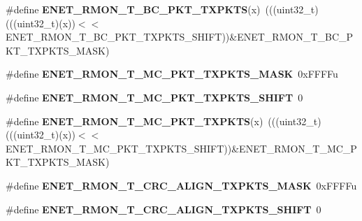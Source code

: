 \begin{DoxyCompactItemize}
\item 
\#define {\bfseries E\+N\+E\+T\+\_\+\+R\+M\+O\+N\+\_\+\+T\+\_\+\+B\+C\+\_\+\+P\+K\+T\+\_\+\+T\+X\+P\+K\+TS}(x)~(((uint32\+\_\+t)(((uint32\+\_\+t)(x))$<$$<$E\+N\+E\+T\+\_\+\+R\+M\+O\+N\+\_\+\+T\+\_\+\+B\+C\+\_\+\+P\+K\+T\+\_\+\+T\+X\+P\+K\+T\+S\+\_\+\+S\+H\+I\+FT))\&E\+N\+E\+T\+\_\+\+R\+M\+O\+N\+\_\+\+T\+\_\+\+B\+C\+\_\+\+P\+K\+T\+\_\+\+T\+X\+P\+K\+T\+S\+\_\+\+M\+A\+SK)\hypertarget{group__ENET__Register__Masks_ga44c8eef437f06566360fde04150c385c}{}\label{group__ENET__Register__Masks_ga44c8eef437f06566360fde04150c385c}

\item 
\#define {\bfseries E\+N\+E\+T\+\_\+\+R\+M\+O\+N\+\_\+\+T\+\_\+\+M\+C\+\_\+\+P\+K\+T\+\_\+\+T\+X\+P\+K\+T\+S\+\_\+\+M\+A\+SK}~0x\+F\+F\+F\+Fu\hypertarget{group__ENET__Register__Masks_gaf3856023c28aa2585937b9b2e3e46fcd}{}\label{group__ENET__Register__Masks_gaf3856023c28aa2585937b9b2e3e46fcd}

\item 
\#define {\bfseries E\+N\+E\+T\+\_\+\+R\+M\+O\+N\+\_\+\+T\+\_\+\+M\+C\+\_\+\+P\+K\+T\+\_\+\+T\+X\+P\+K\+T\+S\+\_\+\+S\+H\+I\+FT}~0\hypertarget{group__ENET__Register__Masks_ga5b480910d2725a8c75b23a0327898400}{}\label{group__ENET__Register__Masks_ga5b480910d2725a8c75b23a0327898400}

\item 
\#define {\bfseries E\+N\+E\+T\+\_\+\+R\+M\+O\+N\+\_\+\+T\+\_\+\+M\+C\+\_\+\+P\+K\+T\+\_\+\+T\+X\+P\+K\+TS}(x)~(((uint32\+\_\+t)(((uint32\+\_\+t)(x))$<$$<$E\+N\+E\+T\+\_\+\+R\+M\+O\+N\+\_\+\+T\+\_\+\+M\+C\+\_\+\+P\+K\+T\+\_\+\+T\+X\+P\+K\+T\+S\+\_\+\+S\+H\+I\+FT))\&E\+N\+E\+T\+\_\+\+R\+M\+O\+N\+\_\+\+T\+\_\+\+M\+C\+\_\+\+P\+K\+T\+\_\+\+T\+X\+P\+K\+T\+S\+\_\+\+M\+A\+SK)\hypertarget{group__ENET__Register__Masks_gacb7fa6647506149367368bd1abcdc94e}{}\label{group__ENET__Register__Masks_gacb7fa6647506149367368bd1abcdc94e}

\item 
\#define {\bfseries E\+N\+E\+T\+\_\+\+R\+M\+O\+N\+\_\+\+T\+\_\+\+C\+R\+C\+\_\+\+A\+L\+I\+G\+N\+\_\+\+T\+X\+P\+K\+T\+S\+\_\+\+M\+A\+SK}~0x\+F\+F\+F\+Fu\hypertarget{group__ENET__Register__Masks_gacccd1e251e3c6aa0159af65a0aee2772}{}\label{group__ENET__Register__Masks_gacccd1e251e3c6aa0159af65a0aee2772}

\item 
\#define {\bfseries E\+N\+E\+T\+\_\+\+R\+M\+O\+N\+\_\+\+T\+\_\+\+C\+R\+C\+\_\+\+A\+L\+I\+G\+N\+\_\+\+T\+X\+P\+K\+T\+S\+\_\+\+S\+H\+I\+FT}~0\hypertarget{group__ENET__Register__Masks_ga2736c6ffc11baa5ce09a120c967841e1}{}\label{group__ENET__Register__Masks_ga2736c6ffc11baa5ce09a120c967841e1}


\end{DoxyCompactItemize}
